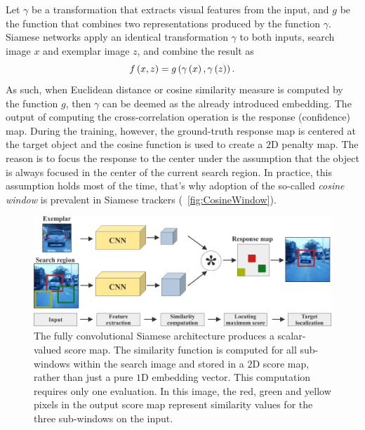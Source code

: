 Let $\gamma$ be a transformation that extracts visual features from the input, and $g$ be the function that combines two representations produced by the function $\gamma$. Siamese networks apply an identical transformation $\gamma$ to both inputs, search image $x$ and exemplar image $z$, and combine the result as
\begin{equation}
    {f} \left( x, z \right) = {g} \left( {\gamma} \left( x \right), {\gamma} \left( z \right) \right).
\end{equation}
As such, when Euclidean distance or cosine similarity measure is computed by the function $g$, then $\gamma$ can be deemed as the already introduced embedding. The output of computing the cross-correlation operation is the response (confidence) map. During the training, however, the ground-truth response map is centered at the target object and the cosine function is used to create a $2$D penalty map. The reason is to focus the response to the center under the assumption that the object is always focused in the center of the current search region. In practice, this assumption holds most of the time, that's why adoption of the so-called \emph{cosine window} is prevalent in Siamese trackers (\figtext{}~\ref{fig:CosineWindow}).

\begin{figure}[!t]
    \centerline{\includegraphics[width=0.9\linewidth]{figures/theoretical_foundations/fully_cnn_siam_tracking_architecture.pdf}}
    \caption[\Gls{siamfc} architecture]{The fully convolutional Siamese architecture produces a scalar-valued score map. The similarity function is computed for all sub-windows within the search image and stored in a $2$D score map, rather than just a pure $1$D embedding vector. This computation requires only one evaluation. In this image, the red, green and yellow pixels in the output score map represent similarity values for the three sub-windows on the input.}
    \label{fig:FullyCNNSiamTrackingArch}
\end{figure}

